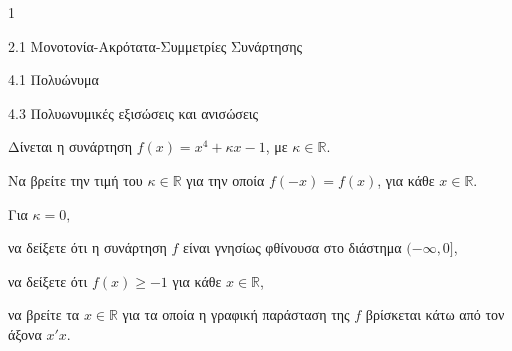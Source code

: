 \begin{ylh}{1}
\item 2.1 Μονοτονία-Ακρότατα-Συμμετρίες Συνάρτησης
\item 4.1 Πολυώνυμα
\item 4.3 Πολυωνυμικές εξισώσεις και ανισώσεις
\end{ylh}
Δίνεται η συνάρτηση $f(x) = x^{4} + \kappa x - 1$, με $\kappa\mathbb{\in R}$.
\begin{alist}
\item Να βρείτε την τιμή του $\kappa\mathbb{\in R}$ για την οποία $f( - x) = f(x)$, για κάθε $x\mathbb{\in R}$.
\item Για $\kappa = 0,$
\end{alist}
\begin{alist}
\item
  να δείξετε ότι η συνάρτηση $f$ είναι γνησίως φθίνουσα στο διάστημα $( - \infty,0\rbrack$,
\end{alist}
\begin{alist}
\item
  να δείξετε ότι $f(x) \geq - 1$ για κάθε $x \in \mathbb{R}$,
\end{alist}
\begin{alist}
\item
  να βρείτε τα $x\mathbb{\in R}$ για τα οποία η γραφική παράσταση της $f$ βρίσκεται κάτω από τον άξονα $x'x$.
\end{alist}

